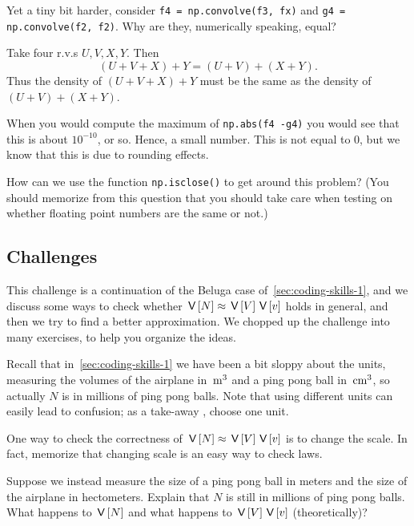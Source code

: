 \documentclass[assignments]{subfiles}
\begin{document}
\begin{exercise}
Yet a tiny bit harder, consider \texttt{f4 = np.convolve(f3, fx)} and \texttt{g4 = np.convolve(f2, f2)}. Why are they, numerically speaking,  equal?
\begin{solution}
Take four r.v.s $U, V, X, Y$. Then
  \begin{equation}
    \label{eq:15}
(U+V+X) + Y = (U+V) + (X+Y).
  \end{equation}
Thus the density of $(U+V+X) + Y$ must be the same as the density of $(U+V) + (X+Y)$.
\end{solution}
\end{exercise}


\begin{exercise}
When you would compute the maximum of \texttt{np.abs(f4 -g4)} you would see that this is about $10^{-10}$, or so.
Hence, a small number.
This is not equal to 0, but we know that this is due to rounding effects.

How can we use the function \texttt{np.isclose()} to get around this problem?
(You should memorize from this question that you should take care when testing on whether floating point numbers are the same or not.)
\end{exercise}



\subsection{Challenges}
\label{sec:challenges-1}

This challenge is a continuation of the Beluga case of~\cref{sec:coding-skills-1}, and we discuss some ways to check whether $\,\mathsf{V}\left[N\right] \approx \,\mathsf{V}\left[V\right] \,\mathsf{V}\left[v\right]$ holds in general, and then we try to find a better approximation. We chopped up the challenge into many exercises, to help you organize the ideas.


Recall that in~\cref{sec:coding-skills-1} we have been a bit sloppy about the units, measuring the volumes of the airplane in $\,\mathrm{m}^{3}$ and a ping pong ball in $\,\mathrm{cm}^{3}$, so actually $N$ is in millions of ping pong balls.
Note that using different units can easily lead to  confusion; as a take-away , choose one unit.

One way to check the correctness of $\,\mathsf{V}\left[N\right] \approx \,\mathsf{V}\left[V\right] \,\mathsf{V}\left[v\right]$ is to change the scale. In fact, memorize that changing scale is an easy way to check laws.

\begin{exercise}
Suppose we instead measure the size of a ping pong ball in meters and the size of the airplane in hectometers.
Explain that $N$ is still in millions of ping pong balls.
What happens to $\,\mathsf{V}\left[N\right]$ and what happens to $\,\mathsf{V}\left[V\right] \,\mathsf{V}\left[v\right]$ (theoretically)?
\end{exercise}
\end{document}
